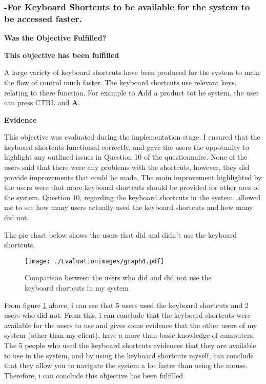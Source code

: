 \pagebreak
\subsubsection{-For Keyboard Shortcuts to be available for the system to be accessed faster.}
\textbf{Was the Objective Fulfilled?} \newline

\textbf{\large{This objective has been fulfilled}}

A large variety of keyboard shortcuts have been produced for the system to make the flow of control much faster. The keyboard shortcuts use relevant keys, relating to there function. For example to \textbf{A}dd a product tot he system, the user can press CTRL and \textbf{A}. 

\textbf{Evidence} \newline

This objective was evaluated during the implementation stage. I ensured that the keyboard shortcuts functioned correctly, and gave the users the oppotunity to highlight any outlined issues in Question 10 of the questionnaire. None of the users said that there were any problems with the shortcuts, however, they did provide improvements that could be made. The main improvement highlighted by the users were that more keyboard shortcuts should be provided for other ares of the system. Question 10, regarding the keyboard shortcuts in the system, allowed me to see how many users actually used the keyboard shortcuts and how many did not.

The pie chart below shows the users that did and didn't use the keyboard shortcuts.

\begin{figure}[H]
\caption{Comparison between the users who did and did not use the keyboard shortcuts in my system} \label{graph4}
\hfill\texttt{[image: ./Evaluationimages/graph4.pdf]}
\end{figure}

From figure \ref{graph4} above, i can see that 5 users used the keyboard shortcuts and 2 users who did not. From this, i can conclude that the keyboard shortcuts were available for the users to use and gives some evidence that the other users of my system (other than my client), have a more than basic knowledge of computers. The 5 people who used the keyboard shortcuts evidences that they are available to use in the system, and by using the keyboard shortcuts myself, can conclude that they allow you to navigate the system a lot faster than using the mouse. Therefore, i can conclude this objective has been fulfilled.


